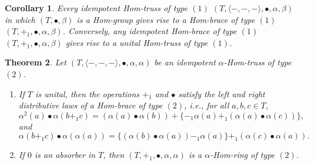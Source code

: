 \documentclass[14pt]{article}
\newtheorem{thm}{Theorem}[section]
\theoremstyle{Definition}
\newtheorem{Coro}[thm]{Corollary}
\theoremstyle{remark}
\begin{document}
\begin{Coro}
Every idempotent Hom-truss of type $(1)$ $(T,\langle-,-,-\rangle,\bullet,\alpha,\beta)$ in which $(T,\bullet,\beta)$ is a Hom-group gives rise to a Hom-brace of type $(1)$ $(T,+_{1},\bullet,\alpha,\beta)$. Conversely, any idempotent Hom-brace of type $(1)$ $(T,+_{1},\bullet,\alpha,\beta)$ gives rise to a unital Hom-truss of type $(1)$.
\end{Coro}

\begin{thm}
Let $(T,\langle-,-,-\rangle,\bullet,\alpha,\alpha)$ be an idempotent $\alpha$-Hom-truss of type $(2)$.
\begin{enumerate}
\item[(1)] If $T$ is unital, then the operations $+_{1}$ and $\bullet$ satisfy the left and right distributive laws of a Hom-brace of type $(2)$, i.e., for all $a,b,c \in T$,
\[
\alpha^{2}(a)\bullet\alpha(b+_{1}c)=(\alpha(a)\bullet\alpha(b))+\{-_{1}\alpha(a)+_{1}(\alpha(a)\bullet\alpha(c))\},
\]
and
\[
\alpha(b+_{1}c)\bullet\alpha(\alpha(a))=\{(\alpha(b)\bullet\alpha(a))-_{1}\alpha(a)\}+_{1}(\alpha(c)\bullet\alpha(a)).
\]

\item[(2)] If $0$ is an absorber in $T$, then $(T,+_{1},\bullet,\alpha,\alpha)$ is a $\alpha$-Hom-ring of type $(2)$.
\end{enumerate}
\end{thm}
\end{document}
